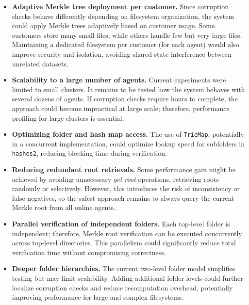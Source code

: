 \begin{itemize}
    \item \textbf{Adaptive Merkle tree deployment per customer.}
    Since corruption checks behave differently depending on filesystem organization, the system could apply Merkle trees adaptively based on customer usage.
    Some customers store many small files, while others handle few but very large files.
    Maintaining a dedicated filesystem per customer (for each agent) would also improve security and isolation, avoiding shared-state interference between unrelated datasets.

    \item \textbf{Scalability to a large number of agents.}
    Current experiments were limited to small clusters.
    It remains to be tested how the system behaves with several dozens of agents.
    If corruption checks require hours to complete, the approach could become impractical at large scale; therefore, performance profiling for large clusters is essential.

    \item \textbf{Optimizing folder and hash map access.}
    The use of \texttt{TrieMap}, potentially in a concurrent implementation,
        could optimize lookup speed for subfolders in \texttt{hashes2}, reducing blocking time during verification.

    \item \textbf{Reducing redundant root retrievals.}
    Some performance gain might be achieved by avoiding unnecessary \emph{get root} operations, retrieving roots randomly or selectively.
    However, this introduces the risk of inconsistency or false negatives, so the safest approach remains to always query the current Merkle root from all online agents.

    \item \textbf{Parallel verification of independent folders.}
    Each top-level folder is independent; therefore, Merkle root verification can be executed concurrently across top-level directories.
    This parallelism could significantly reduce total verification time without compromising correctness.

    \item \textbf{Deeper folder hierarchies.}
    The current two-level folder model simplifies testing but may limit scalability.
    Adding additional folder levels could further localize corruption checks and reduce recomputation overhead, potentially improving performance for large and complex filesystems.


\end{itemize}
